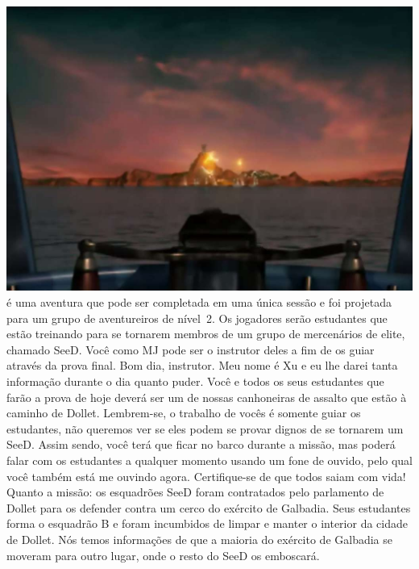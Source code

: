 %
%
\vfill
%
\includegraphics[width=\columnwidth]{./art/siegeofdollet/island.jpg}
%
\vfill
%
 é uma aventura que pode ser completada em uma única sessão e foi projetada para um grupo de aventureiros de nível~2.
Os jogadores serão estudantes que estão treinando para se tornarem membros de um grupo de mercenários de elite, chamado SeeD.
Você como MJ pode ser o instrutor deles a fim de os guiar através da prova final.
%
\vfill
%
%
\vfill
%
Bom dia, instrutor.
Meu nome é Xu e eu lhe darei tanta informação durante o dia quanto puder.
Você e todos os seus estudantes que farão a prova de hoje deverá ser um de nossas canhoneiras de assalto que estão à caminho de Dollet.
Lembrem-se, o trabalho de vocês é somente guiar os estudantes, não queremos ver se eles podem se provar dignos de se tornarem um SeeD.
Assim sendo, você terá que ficar no barco durante a missão, mas poderá falar com os estudantes a qualquer momento usando um fone de ouvido, pelo qual você também está me ouvindo agora. Certifique-se de que todos saiam com vida!
%
\vfill
%
Quanto a missão:
os esquadrões SeeD foram contratados pelo parlamento de Dollet para os defender contra um cerco do exército de Galbadia.
Seus estudantes forma o esquadrão B e foram incumbidos de limpar e manter o interior da cidade de Dollet.
Nós temos informações de que a maioria do exército de Galbadia se moveram para outro lugar, onde o resto do SeeD os emboscará.
